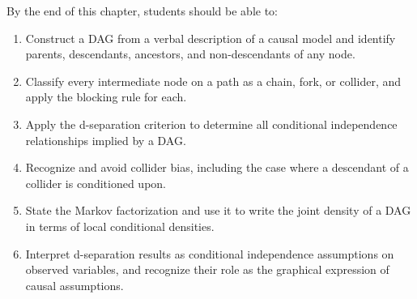 \documentclass[master.tex]{subfiles}
\begin{document}
\begin{tcolorbox}[defstyle, title={Learning Objectives}]
By the end of this chapter, students should be able to:
\begin{enumerate}
  \item Construct a DAG from a verbal description of a causal model and identify
        parents, descendants, ancestors, and non-descendants of any node.
  \item Classify every intermediate node on a path as a chain, fork, or collider,
        and apply the blocking rule for each.
  \item Apply the d-separation criterion to determine all conditional independence
        relationships implied by a DAG.
  \item Recognize and avoid collider bias, including the case where a descendant
        of a collider is conditioned upon.
  \item State the Markov factorization and use it to write the joint density of a
        DAG in terms of local conditional densities.
  \item Interpret d-separation results as conditional independence assumptions
        on observed variables, and recognize their role as the graphical
        expression of causal assumptions.
\end{enumerate}
\end{tcolorbox}

\end{document}

